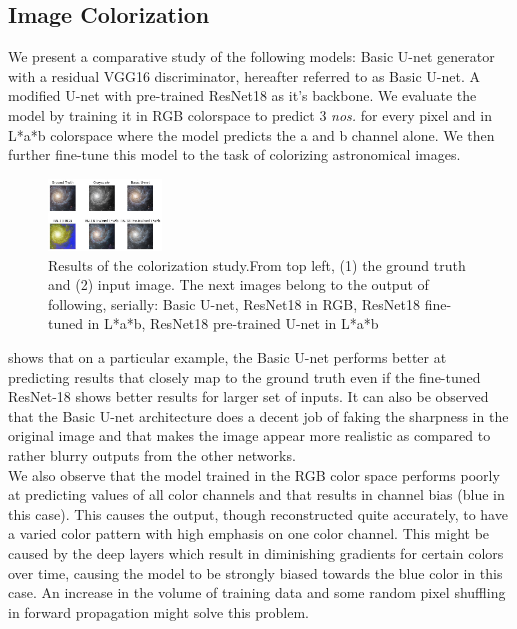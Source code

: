 \documentclass[10pt,twocolumn,letterpaper]{article}
\begin{document}
    \subsection{Image Colorization}
    \hspace*{0.167 in}We present a comparative study of the following models: Basic U-net generator with a residual VGG16 discriminator, hereafter referred to as Basic U-net. A modified U-net with pre-trained ResNet18 as it's backbone. We evaluate the model by training it in RGB colorspace to predict 3 \textit{nos.} for every pixel and in L*a*b colorspace where the model predicts the a and b channel alone. We then further fine-tune this model to the task of colorizing astronomical images.
    \begin{figure}[!htb]
    \centering
    	\includegraphics[width=0.27\textwidth]{figures/comparison_color}
    	\caption{Results of the colorization study.From top left, (1) the ground truth and (2) input image. The next images belong to the output of following, serially: Basic U-net, ResNet18 in RGB, ResNet18 fine-tuned in L*a*b, ResNet18 pre-trained U-net in L*a*b}
    	\label{color_results}
    \end{figure}
     shows that on a particular example, the Basic U-net performs better at predicting results that closely map to the ground truth even if the fine-tuned ResNet-18 shows better results for larger set of inputs. It can also be observed that the Basic U-net architecture does a decent job of faking the sharpness in the original image and that makes the image appear more realistic as compared to rather blurry outputs from the other networks. \\
    \hspace*{0.167 in}We also observe that the model trained in the RGB color space performs poorly at predicting values of all color channels and that results in channel bias (blue in this case). This causes the output, though reconstructed quite accurately, to have a varied color pattern with high emphasis on one color channel. This might be caused by the deep layers which result in diminishing gradients for certain colors over time, causing the model to be strongly biased towards the blue color in this case. An increase in the volume of training data and some random pixel shuffling in forward propagation might solve this problem. \\
\end{document}
